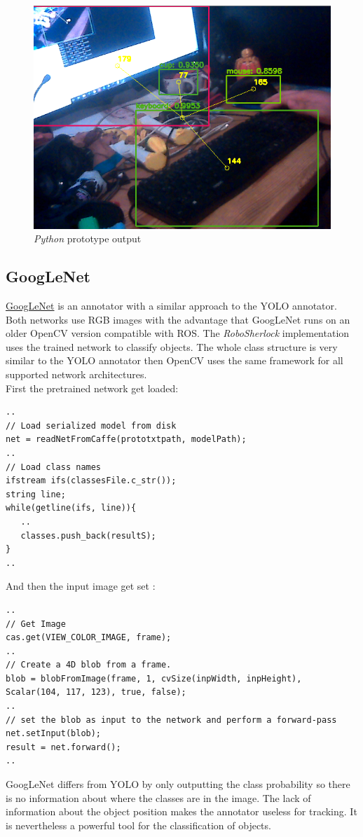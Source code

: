 \documentclass[main.tex]{subfiles}
\begin{document}
\begin{figure}[H]
\centering
\includegraphics[width=1\textwidth]{pictures/perception/YOLO.png}
\caption{\textit{Python} prototype output}
\end{figure}

				\subsection{GoogLeNet}
\href{https://github.com/SUTURO/suturo_perception/blob/Handcamera_tracking/rs_Athene/src/GoogLeNet.cpp}{GoogLeNet} is an annotator with a similar approach to the YOLO annotator. Both networks use RGB images with the advantage that GoogLeNet runs on an older OpenCV version compatible with ROS.
The \textit{RoboSherlock} implementation uses the trained network to classify objects. The whole class structure is very similar to the YOLO annotator then OpenCV uses the same framework for all supported network architectures. \\
First the pretrained network get loaded: 
\begin{lstlisting}
.. 
// Load serialized model from disk
net = readNetFromCaffe(prototxtpath, modelPath);
..
// Load class names 
ifstream ifs(classesFile.c_str());
string line;
while(getline(ifs, line)){
   ..
   classes.push_back(resultS);
}
..
\end{lstlisting}
And then the input image get set : 
\begin{lstlisting}
..
// Get Image 
cas.get(VIEW_COLOR_IMAGE, frame);
..
// Create a 4D blob from a frame.
blob = blobFromImage(frame, 1, cvSize(inpWidth, inpHeight), Scalar(104, 117, 123), true, false);
..
// set the blob as input to the network and perform a forward-pass
net.setInput(blob);
result = net.forward();
..
\end{lstlisting}
GoogLeNet differs from YOLO by only outputting the class probability so there is no information about where the classes are in the image. The lack of information about the object position makes the annotator useless for tracking. It is nevertheless a powerful tool for the classification of objects. 
\end{document}
